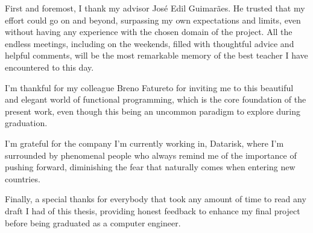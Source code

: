 First and foremost, I thank my advisor José Edil Guimarães. He trusted that my effort could go on and beyond, surpassing my own expectations and limits, even without having any experience with the chosen domain of the project. All the endless meetings, including on the weekends, filled with thoughtful advice and helpful comments, will be the most remarkable memory of the best teacher I have encountered to this day.

I'm thankful for my colleague Breno Fatureto for inviting me to this beautiful and elegant world of functional programming, which is the core foundation of the present work, even though this being an uncommon paradigm to explore during graduation.

I'm grateful for the company I'm currently working in, Datarisk, where I'm surrounded by phenomenal people who always remind me of the importance of pushing forward, diminishing the fear that naturally comes when entering new countries.

Finally, a special thanks for everybody that took any amount of time to read any draft I had of this thesis, providing honest feedback to enhance my final project before being graduated as a computer engineer. 
